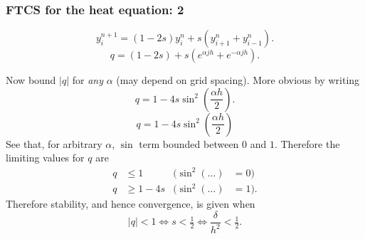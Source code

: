 \documentclass{beamer}
\begin{document}
\begin{frame}
  \frametitle{FTCS for the heat equation: 2}
  
  \begin{equation*}
    y_i^{n+1} = ( 1 - 2 s ) y_i^n + s \left( y_{i+1}^n + y_{i-1}^n
    \right).
  \end{equation*}
  \begin{equation*}
    q = (1 - 2 s) + s \left( e^{\alpha j h} +  e^{-\alpha j h} \right).
  \end{equation*}
  \begin{overlayarea}{\textwidth}{0.7\textheight}
    {
      Now bound $|q|$ for \emph{any} $\alpha$
      (may depend on grid spacing).
    }
    {
      More obvious by writing
      \begin{equation*}
        q = 1 - 4 s \sin^2 \left(\frac{\alpha h}{2} \right).
      \end{equation*}
    }
    {
      \vspace{-1ex}
      \begin{equation*}
        q = 1 - 4 s \sin^2 \left(\frac{\alpha h}{2} \right)
      \end{equation*}
      See that, for arbitrary $\alpha$, $\sin$ term
      bounded between $0$ and $1$.
    }
    {
      Therefore the limiting values for $q$ are
      \begin{align*}
        q & \le 1 & (\sin^2(\dots) & = 0) \\
        q & \ge 1 - 4 s & (\sin^2(\dots) & = 1).
      \end{align*}
    }
    {
      Therefore stability, and hence convergence, is given when \vspace{-.5ex}
      \begin{equation*}
        |q| < 1 \Leftrightarrow s < \tfrac{1}{2} \Leftrightarrow
        \frac{\delta}{h^2} < \tfrac{1}{2}. 
      \end{equation*}
    }
  \end{overlayarea}
  
\end{frame}
\end{document}
